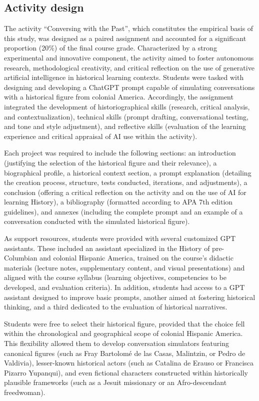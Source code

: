 \documentclass[english]{textolivre}
\begin{document}
\subsection{Activity design}
The activity ``Conversing with the Past'', which constitutes the empirical basis of this study, was designed as a paired assignment and accounted for a significant proportion (20\%) of the final course grade. Characterized by a strong experimental and innovative component, the activity aimed to foster autonomous research, methodological creativity, and critical reflection on the use of generative artificial intelligence in historical learning contexts. Students were tasked with designing and developing a ChatGPT prompt capable of simulating conversations with a historical figure from colonial America. Accordingly, the assignment integrated the development of historiographical skills (research, critical analysis, and contextualization), technical skills (prompt drafting, conversational testing, and tone and style adjustment), and reflective skills (evaluation of the learning experience and critical appraisal of AI use within the activity).

Each project was required to include the following sections: an introduction (justifying the selection of the historical figure and their relevance), a biographical profile, a historical context section, a prompt explanation (detailing the creation process, structure, tests conducted, iterations, and adjustments), a conclusion (offering a critical reflection on the activity and on the use of AI for learning History), a bibliography (formatted according to APA 7th edition guidelines), and annexes (including the complete prompt and an example of a conversation conducted with the simulated historical figure).

As support resources, students were provided with several customized GPT assistants. These included an assistant specialized in the History of pre-Columbian and colonial Hispanic America, trained on the course’s didactic materials (lecture notes, supplementary content, and visual presentations) and aligned with the course syllabus (learning objectives, competencies to be developed, and evaluation criteria). In addition, students had access to a GPT assistant designed to improve basic prompts, another aimed at fostering historical thinking, and a third dedicated to the evaluation of historical narratives.

Students were free to select their historical figure, provided that the choice fell within the chronological and geographical scope of colonial Hispanic America. This flexibility allowed them to develop conversation simulators featuring canonical figures (such as Fray Bartolomé de las Casas, Malintzin, or Pedro de Valdivia), lesser-known historical actors (such as Catalina de Erauso or Francisca Pizarro Yupanqui), and even fictional characters constructed within historically plausible frameworks (such as a Jesuit missionary or an Afro-descendant freedwoman).
\end{document}

